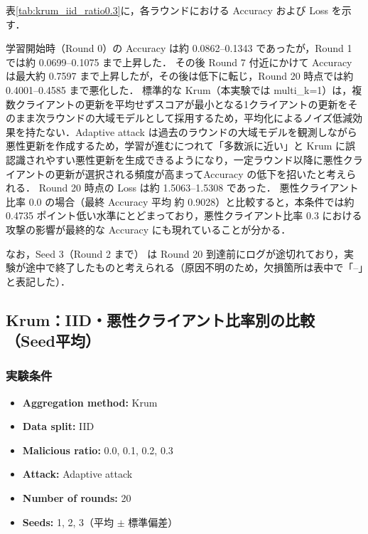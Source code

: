 \documentclass[a4j,twocolumn,dvipdfmx]{jsarticle}
\begin{document}
表\ref{tab:krum_iid_ratio0.3}に，各ラウンドにおける
Accuracy および Loss を示す．

学習開始時（Round 0）の Accuracy は約 0.0862--0.1343 であったが，Round 1 では約 0.0699--0.1075 まで上昇した． その後 Round 7 付近にかけて Accuracy は最大約 0.7597 まで上昇したが，その後は低下に転じ，Round 20 時点では約 0.4001--0.4585 まで悪化した． 標準的な Krum（本実験では multi\_k=1）は，複数クライアントの更新を平均せずスコアが最小となる1クライアントの更新をそのまま次ラウンドの大域モデルとして採用するため，平均化によるノイズ低減効果を持たない．Adaptive attack は過去のラウンドの大域モデルを観測しながら悪性更新を作成するため，学習が進むにつれて「多数派に近い」と Krum に誤認識されやすい悪性更新を生成できるようになり，一定ラウンド以降に悪性クライアントの更新が選択される頻度が高まってAccuracy の低下を招いたと考えられる． Round 20 時点の Loss は約 1.5063--1.5308 であった． 悪性クライアント比率 0.0 の場合（最終 Accuracy 平均 約 0.9028）と比較すると，本条件では約 0.4735 ポイント低い水準にとどまっており，悪性クライアント比率 0.3 における攻撃の影響が最終的な Accuracy にも現れていることが分かる．

なお，Seed 3（Round 2 まで） は Round 20 到達前にログが途切れており，実験が途中で終了したものと考えられる（原因不明のため，欠損箇所は表中で「--」と表記した）．

\clearpage
\subsection{Krum：IID・悪性クライアント比率別の比較（Seed平均）}

\subsubsection{実験条件}

\begin{itemize}
    \item \textbf{Aggregation method:} Krum
    \item \textbf{Data split:} IID
    \item \textbf{Malicious ratio:} 0.0, 0.1, 0.2, 0.3
    \item \textbf{Attack:} Adaptive attack
    \item \textbf{Number of rounds:} 20
    \item \textbf{Seeds:} 1, 2, 3（平均 $\pm$ 標準偏差）
\end{itemize}
\end{document}
